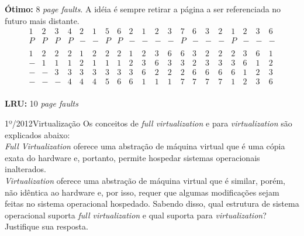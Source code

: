 \begin{exercicio}
  \textbf{Ótimo:} 8 \textit{page faults}. A idéia é sempre retirar a página a ser referenciada no futuro mais distante. \\
  \[
  \begin{array}{cccccccccccccccccccc}
1 & 2 & 3 & 4 & 2 & 1 & 5 & 6 & 2 & 1 & 2 & 3 & 7 & 6 & 3 & 2 & 1 & 2 & 3 & 6 \\ \hline
P & P & P & P & - & - & P & P & - & - & - & - & P & - & - & - & P & - & - & - \\
\\
1 & 2 & 2 & 2 & 1 & 2 & 2 & 2 & 1 & 2 & 3 & 6 & 6 & 3 & 2 & 2 & 2 & 3 & 6 & 1 \\
- & 1 & 1 & 1 & 2 & 1 & 1 & 1 & 2 & 3 & 6 & 3 & 3 & 2 & 3 & 3 & 3 & 6 & 1 & 2 \\
- & - & 3 & 3 & 3 & 3 & 3 & 3 & 3 & 6 & 2 & 2 & 2 & 6 & 6 & 6 & 6 & 1 & 2 & 3 \\
- & - & - & 4 & 4 & 4 & 5 & 6 & 6 & 1 & 1 & 1 & 7 & 7 & 7 & 7 & 1 & 2 & 3 & 6 \\
  \end{array}
  \]

  \textbf{LRU:} 10 \textit{page faults} \\

\end{exercicio}

\begin{exercicio}
  {1º/2012}{Virtualização}
  {Os conceitos de \textit{full virtualization} e para \textit{virtualization} são explicados abaixo:\\
  \textit{Full Virtualization} oferece uma abstração de máquina virtual que é uma cópia exata do hardware e, portanto, permite hospedar sistemas operacionais inalterados.\\
  \textit{Virtualization} oferece uma abstração de máquina virtual que é similar, porém, não idêntica ao hardware e, por isso, requer que algumas modificações sejam feitas no sistema operacional hospedado.
  Sabendo disso, qual estrutura de sistema operacional suporta \textit{full virtualization} e qual suporta para \textit{virtualization}? Justifique sua resposta.}
\end{exercicio}

